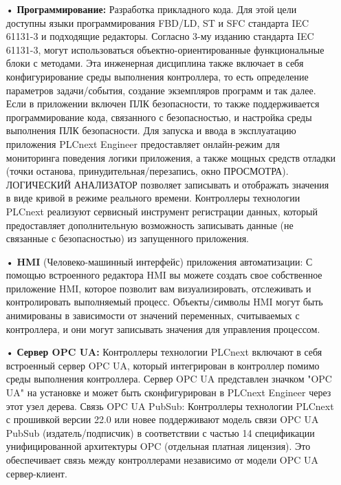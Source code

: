 {\begin{itemize}[leftmargin=2.15cm, labelwidth=0.65cm, labelsep=0.0cm]
		\item[•] \textbf{Программирование:}  Разработка прикладного кода. Для этой цели доступны языки программирования FBD/LD, ST и SFC стандарта IEC 61131-3 и подходящие редакторы. Согласно 3-му изданию стандарта IEC 61131-3, могут использоваться объектно-ориентированные функциональные блоки с методами. Эта инженерная дисциплина также включает в себя конфигурирование среды выполнения контроллера, то есть определение параметров задачи/события, создание экземпляров программ и так далее. Если в приложении включен ПЛК безопасности, то также поддерживается программирование кода, связанного с безопасностью, и настройка среды выполнения ПЛК безопасности. Для запуска и ввода в эксплуатацию приложения PLCnext Engineer предоставляет онлайн-режим для мониторинга поведения логики приложения, а также мощных средств отладки (точки останова, принудительная/перезапись, окно ПРОСМОТРА). ЛОГИЧЕСКИЙ АНАЛИЗАТОР позволяет записывать и отображать значения в виде кривой в режиме реального времени. Контроллеры технологии PLCnext реализуют сервисный инструмент регистрации данных, который предоставляет дополнительную возможность записывать данные (не связанные с безопасностью) из запущенного приложения.
		
		\addtocounter{itemcntr}{1}
		
		\item[•] \textbf{HMI} (Человеко-машинный интерфейс) приложения автоматизации: С помощью встроенного редактора HMI вы можете создать свое собственное приложение HMI, которое позволит вам визуализировать, отслеживать и контролировать выполняемый процесс. Объекты/символы HMI могут быть анимированы в зависимости от значений переменных, считываемых с контроллера, и они могут записывать значения для управления процессом.
		
		\addtocounter{itemcntr}{1}
		
		\item[•] \textbf{Сервер OPC UA:}  Контроллеры технологии PLCnext включают в себя встроенный сервер OPC UA, который интегрирован в контроллер помимо среды выполнения контроллера. Сервер OPC UA представлен значком "OPC UA" на установке и может быть сконфигурирован в PLCnext Engineer через этот узел дерева. Связь OPC UA PubSub: Контроллеры технологии PLCnext с прошивкой версии 22.0 или новее поддерживают модель связи OPC UA PubSub (издатель/подписчик) в соответствии с частью 14 спецификации унифицированной архитектуры OPC (отдельная платная лицензия). Это обеспечивает связь между контроллерами независимо от модели OPC UA сервер-клиент.
		

\end{itemize}}

